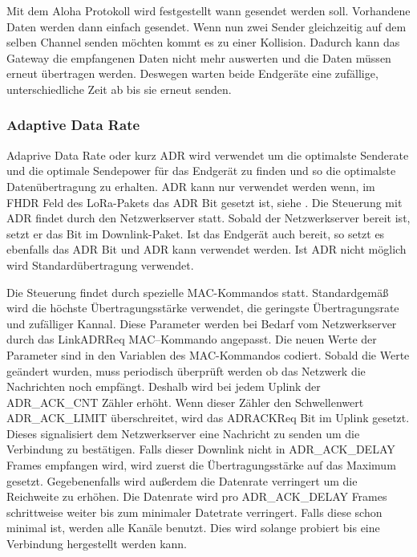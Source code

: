 \documentclass[a4paper,12pt]{article}
\begin{document}
            Mit dem Aloha Protokoll wird festgestellt wann gesendet werden soll. Vorhandene Daten werden dann einfach 
            gesendet. Wenn nun zwei Sender gleichzeitig auf dem selben Channel senden 
            möchten kommt es zu einer Kollision. Dadurch kann das Gateway die empfangenen Daten nicht mehr auswerten 
            und die Daten müssen erneut übertragen werden. Deswegen warten beide Endgeräte eine zufällige, 
            unterschiedliche Zeit ab bis sie erneut senden.

            \subsubsection{Adaptive Data Rate}\label{sec:ADR}
                Adaprive Data Rate oder kurz ADR wird verwendet um die optimalste Senderate und die optimale 
                Sendepower für das Endgerät zu finden und so die optimalste Datenübertragung zu erhalten. ADR kann nur 
                verwendet werden wenn, im FHDR Feld des LoRa-Pakets das ADR Bit gesetzt ist, siehe 
                . Die Steuerung mit ADR findet durch den Netzwerkserver statt. Sobald der 
                Netzwerkserver bereit ist, setzt er das Bit im Downlink-Paket. Ist das Endgerät auch bereit, so 
                setzt es ebenfalls das ADR Bit und ADR kann verwendet werden. Ist ADR nicht möglich wird Standardübertragung 
                verwendet.

                Die Steuerung findet durch spezielle MAC-Kommandos statt. Standardgemäß wird die höchste 
                Übertragungsstärke verwendet, die geringste Übertragungsrate und zufälliger Kannal. Diese Parameter werden bei Bedarf 
                vom Netzwerkserver durch das LinkADRReq MAC–Kommando angepasst. Die 
                neuen Werte der Parameter sind in den Variablen des MAC-Kommandos codiert. Sobald die Werte geändert 
                wurden, muss periodisch überprüft werden ob das 
                Netzwerk die Nachrichten noch empfängt. Deshalb wird bei jedem Uplink der ADR\_ACK\_CNT Zähler erhöht. 
                Wenn dieser Zähler den Schwellenwert ADR\_ACK\_LIMIT
                überschreitet, wird das ADRACKReq Bit im Uplink gesetzt. Dieses signalisiert dem Netzwerkserver eine
                Nachricht zu senden um die Verbindung zu bestätigen. Falls dieser Downlink nicht in 
                ADR\_ACK\_DELAY Frames empfangen wird, wird zuerst die Übertragungsstärke auf das Maximum gesetzt. 
                Gegebenenfalls wird außerdem die Datenrate verringert um die Reichweite zu erhöhen. Die Datenrate wird 
                pro ADR\_ACK\_DELAY Frames schrittweise weiter bis zum minimaler Datetrate verringert. Falls diese schon 
                minimal ist, werden alle Kanäle benutzt. Dies wird solange probiert bis eine Verbindung 
                hergestellt werden kann. \cite[S.19 f]{LoRaSpec}         
\end{document}
